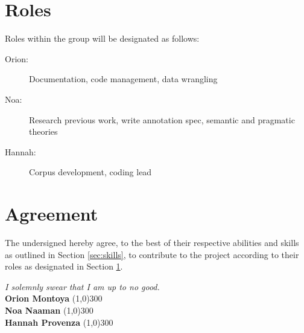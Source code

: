 \documentclass{article}
\newcommand{\groupmember}[1]{#1}
\newcommand{\role}[1]{#1}
\newcommand{\sigline}[2]{\vspace{2em} #1 \hfill \line(1,0){#2}}
\begin{document}
\section{Roles} %
\label{sec:roles}

Roles within the group will be designated as follows:

\begin{description}
    \item[\role{Orion}:] Documentation, code management, data wrangling
    \item[\role{Noa}:] Research previous work, write annotation spec, semantic and pragmatic theories
    \item[\role{Hannah}:] Corpus development, coding lead
\end{description}

\section{Agreement} %
\label{par:agreement}
The undersigned hereby agree, to the best of their respective abilities and skills
as outlined in Section \ref{sec:skills}, to contribute to the project according to
their roles as designated in Section \ref{sec:roles}.

\textit{I solemnly swear that I am up to no good.}
\vspace{2em}\\
\sigline{\textbf{\groupmember{Orion Montoya}}}{300}\\
\sigline{\textbf{\groupmember{Noa Naaman}}}{300}\\
\sigline{\textbf{\groupmember{Hannah Provenza}}}{300}\\
\end{document}
